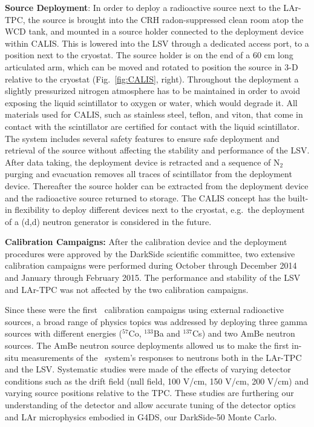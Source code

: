 \noindent \textbf{Source Deployment}: In order to deploy a radioactive source next to the LAr-TPC, the source is brought into the CRH radon-suppressed clean room atop the WCD tank, and mounted in a source holder connected to the deployment device within CALIS. This is lowered into the LSV through a dedicated access port, to a position next to the cryostat. The source holder is on the end of a 60 cm long articulated arm, which can be moved and rotated to position the source in 3-D relative to the cryostat (Fig.~\ref{fig:CALIS}, right). Throughout the deployment a slightly pressurized nitrogen atmosphere has to be maintained in order to avoid exposing the liquid scintillator to oxygen or water, which would degrade it. All materials used for CALIS, such as stainless steel, teflon, and viton, that come in contact with the scintillator are certified for contact with the liquid scintillator. The system includes several safety features to ensure safe deployment and retrieval of the source without affecting the stability and performance of the LSV. After data taking, the deployment device is retracted and a sequence of N$_2$ purging and evacuation removes all traces of scintillator from the deployment device. Thereafter the source holder can be extracted from the deployment device and the radioactive source returned to storage.
The CALIS concept has the built-in flexibility to deploy different devices next to the cryostat, e.g.~the deployment of a (d,d) neutron generator is considered in the future.

\noindent \textbf{Calibration Campaigns:} After the calibration device and the deployment procedures were approved by the DarkSide scientific committee, two extensive calibration campaigns were performed during October through December 2014 and January through February 2015. The performance and stability of the LSV and LAr-TPC was not affected by the two calibration campaigns.

Since these were the first \dsf\ calibration campaigns using external radioactive sources, a broad range of physics topics was addressed by deploying three gamma sources with different energies ($^{57}$Co, $^{133}$Ba and $^{137}$Cs) and two AmBe neutron sources. The AmBe neutron source deployments allowed us to make the first in-situ measurements of the \dsf\ system's responses to neutrons both in the LAr-TPC and the LSV.
Systematic studies were made of the effects of varying detector conditions such as the drift field (null field, 100 V/cm, 150 V/cm, 200 V/cm) and varying source positions relative to the TPC. These studies are furthering our understanding of the detector and allow accurate tuning of the detector optics and LAr microphysics embodied in G4DS, our DarkSide-50 Monte Carlo. 
